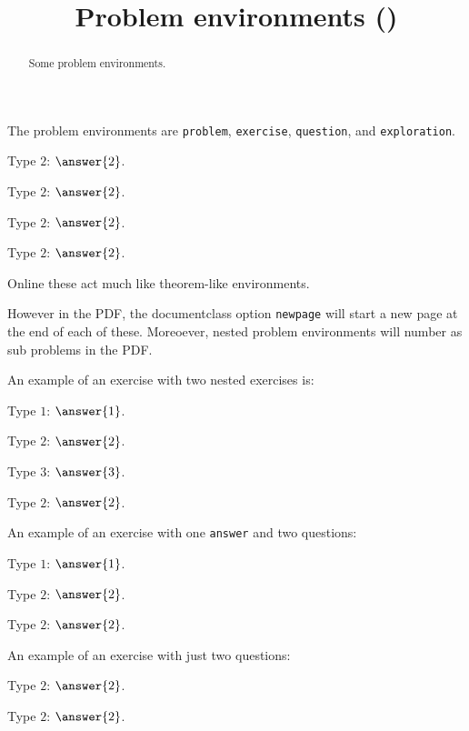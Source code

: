 \documentclass{ximera}
\title{Problem environments (\jobname)}
\begin{document}
\begin{abstract}
  Some problem environments.
\end{abstract}
\maketitle

The problem environments are \verb|problem|, \verb|exercise|, \verb|question|, and \verb|exploration|.


\begin{exercise}
  Type $2$: $\answer{2}$.
\end{exercise}

\begin{problem}
  Type $2$: $\answer{2}$.
\end{problem}

\begin{question}
  Type $2$: $\answer{2}$.
\end{question}

\begin{exploration}
  Type $2$: $\answer{2}$.
\end{exploration}

Online these act much like theorem-like environments.

However in the PDF, the documentclass option \verb|newpage| will start
a new page at the end of each of these. Moreoever, nested problem
environments will number as sub problems in the PDF.

An example of an exercise with two nested exercises is:
\begin{exercise}
  Type $1$: $\answer{1}$.
  \begin{exercise}
    Type $2$: $\answer{2}$.
    \begin{exercise}
      Type $3$: $\answer{3}$.
    \end{exercise}
  \end{exercise}
  \begin{exercise}
    Type $2$: $\answer{2}$.
  \end{exercise}
\end{exercise}


An example of an exercise with one \verb|answer| and two questions:

\begin{exercise}
  Type $1$: $\answer{1}$.
  \begin{question}
    Type $2$: $\answer{2}$.
  \end{question}
  \begin{question}
    Type $2$: $\answer{2}$.
  \end{question}
\end{exercise}

An example of an exercise with just two questions:

\begin{exercise}
  \begin{question}
    Type $2$: $\answer{2}$.
  \end{question}
  \begin{question}
    Type $2$: $\answer{2}$.
  \end{question}
\end{exercise}
\end{document}
